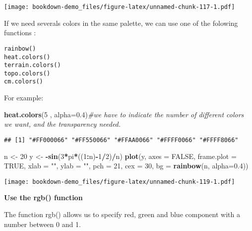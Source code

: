 \documentclass[]{book}
\newenvironment{Shaded}{\begin{snugshade}}{\end{snugshade}}
\newcommand{\KeywordTok}[1]{\textcolor[rgb]{0.13,0.29,0.53}{\textbf{#1}}}
\newcommand{\DataTypeTok}[1]{\textcolor[rgb]{0.13,0.29,0.53}{#1}}
\newcommand{\DecValTok}[1]{\textcolor[rgb]{0.00,0.00,0.81}{#1}}
\newcommand{\FloatTok}[1]{\textcolor[rgb]{0.00,0.00,0.81}{#1}}
\newcommand{\StringTok}[1]{\textcolor[rgb]{0.31,0.60,0.02}{#1}}
\newcommand{\CommentTok}[1]{\textcolor[rgb]{0.56,0.35,0.01}{\textit{#1}}}
\newcommand{\OtherTok}[1]{\textcolor[rgb]{0.56,0.35,0.01}{#1}}
\newcommand{\OperatorTok}[1]{\textcolor[rgb]{0.81,0.36,0.00}{\textbf{#1}}}
\newcommand{\NormalTok}[1]{#1}
\theoremstyle{definition}
\theoremstyle{definition}
\theoremstyle{definition}
\theoremstyle{remark}
\begin{document}
\texttt{[image: bookdown-demo\_files/figure-latex/unnamed-chunk-117-1.pdf]}

If we need severals colors in the same palette, we can use one of the
folowing functions :

\begin{verbatim}
rainbow() 
heat.colors() 
terrain.colors() 
topo.colors() 
cm.colors()
\end{verbatim}

For example:

\begin{Shaded}
\begin{Highlighting}[]
\KeywordTok{heat.colors}\NormalTok{(}\DecValTok{5}\NormalTok{ , }\DataTypeTok{alpha=}\FloatTok{0.4}\NormalTok{)}\CommentTok{#we have to indicate the number of different colors we want, and the transparency needed.}
\end{Highlighting}
\end{Shaded}

\begin{verbatim}
## [1] "#FF000066" "#FF550066" "#FFAA0066" "#FFFF0066" "#FFFF8066"
\end{verbatim}

\begin{Shaded}
\begin{Highlighting}[]
\NormalTok{n <-}\StringTok{ }\DecValTok{20}
\NormalTok{y <-}\StringTok{ }\OperatorTok{-}\KeywordTok{sin}\NormalTok{(}\DecValTok{3}\OperatorTok{*}\NormalTok{pi}\OperatorTok{*}\NormalTok{((}\DecValTok{1}\OperatorTok{:}\NormalTok{n)}\OperatorTok{-}\DecValTok{1}\OperatorTok{/}\DecValTok{2}\NormalTok{)}\OperatorTok{/}\NormalTok{n)}
\KeywordTok{plot}\NormalTok{(y, }\DataTypeTok{axes =} \OtherTok{FALSE}\NormalTok{, }\DataTypeTok{frame.plot =} \OtherTok{TRUE}\NormalTok{, }\DataTypeTok{xlab =} \StringTok{""}\NormalTok{, }\DataTypeTok{ylab =} \StringTok{""}\NormalTok{, }\DataTypeTok{pch =} \DecValTok{21}\NormalTok{, }\DataTypeTok{cex =} \DecValTok{30}\NormalTok{, }
     \DataTypeTok{bg =} \KeywordTok{rainbow}\NormalTok{(n, }\DataTypeTok{alpha=}\FloatTok{0.4}\NormalTok{))}
\end{Highlighting}
\end{Shaded}

\texttt{[image: bookdown-demo\_files/figure-latex/unnamed-chunk-119-1.pdf]}

\textbf{Use the rgb() function}

The function rgb() allows us to specify red, green and blue component
with a number between 0 and 1.
\end{document}

